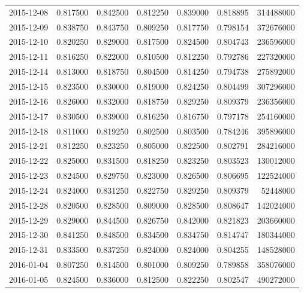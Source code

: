 \begin{tabular}{lrrrrrr}
2015-12-08 &    0.817500 &    0.842500 &    0.812250 &    0.839000 &    0.818895 &   314488000 \\
2015-12-09 &    0.838750 &    0.843750 &    0.809250 &    0.817750 &    0.798154 &   372676000 \\
2015-12-10 &    0.820250 &    0.829000 &    0.817500 &    0.824500 &    0.804743 &   236596000 \\
2015-12-11 &    0.816250 &    0.822000 &    0.810500 &    0.812250 &    0.792786 &   227320000 \\
2015-12-14 &    0.813000 &    0.818750 &    0.804500 &    0.814250 &    0.794738 &   275892000 \\
2015-12-15 &    0.823500 &    0.830000 &    0.819000 &    0.824250 &    0.804499 &   307296000 \\
2015-12-16 &    0.826000 &    0.832000 &    0.818750 &    0.829250 &    0.809379 &   236356000 \\
2015-12-17 &    0.830500 &    0.839000 &    0.816250 &    0.816750 &    0.797178 &   254160000 \\
2015-12-18 &    0.811000 &    0.819250 &    0.802500 &    0.803500 &    0.784246 &   395896000 \\
2015-12-21 &    0.812250 &    0.823250 &    0.805000 &    0.822500 &    0.802791 &   284216000 \\
2015-12-22 &    0.825000 &    0.831500 &    0.818250 &    0.823250 &    0.803523 &   130012000 \\
2015-12-23 &    0.824500 &    0.829750 &    0.823000 &    0.826500 &    0.806695 &   122524000 \\
2015-12-24 &    0.824000 &    0.831250 &    0.822750 &    0.829250 &    0.809379 &    52448000 \\
2015-12-28 &    0.820500 &    0.828500 &    0.809000 &    0.828500 &    0.808647 &   142024000 \\
2015-12-29 &    0.829000 &    0.844500 &    0.826750 &    0.842000 &    0.821823 &   203660000 \\
2015-12-30 &    0.841250 &    0.848500 &    0.834500 &    0.834750 &    0.814747 &   180344000 \\
2015-12-31 &    0.833500 &    0.837250 &    0.824000 &    0.824000 &    0.804255 &   148528000 \\
2016-01-04 &    0.807250 &    0.814500 &    0.801000 &    0.809250 &    0.789858 &   358076000 \\
2016-01-05 &    0.824500 &    0.836000 &    0.812500 &    0.822250 &    0.802547 &   490272000 \\

\end{tabular}
